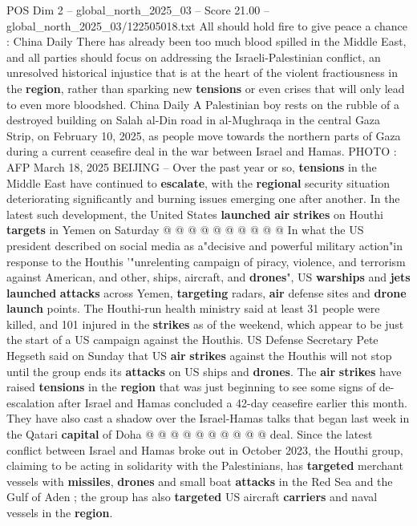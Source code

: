 \begin{textsample}{POS Dim 2 – global\_north\_2025\_03 – Score 21.00 – global\_north\_2025\_03/122505018.txt}  \label{ex:f2_pos_414}
All should hold fire to give peace a chance : China Daily There has already been too much blood spilled in the Middle East, and all parties should focus on addressing the Israeli-Palestinian conflict, an unresolved historical injustice that is at the heart of the violent fractiousness in the \textbf{region}, rather than sparking new \textbf{tensions} or even crises that will only lead to even more bloodshed.
China Daily A Palestinian boy rests on the rubble of a destroyed building on Salah al-Din road in al-Mughraqa in the central Gaza Strip, on February 10, 2025, as people move towards the northern parts of Gaza during a current ceasefire deal in the war between Israel and Hamas.
PHOTO : AFP March 18, 2025 BEIJING -- Over the past year or so, \textbf{tensions} in the Middle East have continued to \textbf{escalate}, with the \textbf{regional} security situation deteriorating significantly and burning issues emerging one after another.
In the latest such development, the United States \textbf{launched} \textbf{air} \textbf{strikes} on Houthi \textbf{targets} in Yemen on Saturday @ @ @ @ @ @ @ @ @ @ In what the US president described on social media as a"decisive and powerful military action"in response to the Houthis '"unrelenting campaign of piracy, violence, and terrorism against American, and other, ships, aircraft, and \textbf{drones}", US \textbf{warships} and \textbf{jets} \textbf{launched} \textbf{attacks} across Yemen, \textbf{targeting} radars, \textbf{air} defense sites and \textbf{drone} \textbf{launch} points.
The Houthi-run health ministry said at least 31 people were killed, and 101 injured in the \textbf{strikes} as of the weekend, which appear to be just the start of a US campaign against the Houthis.
US Defense Secretary Pete Hegseth said on Sunday that US \textbf{air} \textbf{strikes} against the Houthis will not stop until the group ends its \textbf{attacks} on US ships and \textbf{drones}.
The \textbf{air} \textbf{strikes} have raised \textbf{tensions} in the \textbf{region} that was just beginning to see some signs of de-escalation after Israel and Hamas concluded a 42-day ceasefire earlier this month.
They have also cast a shadow over the Israel-Hamas talks that began last week in the Qatari \textbf{capital} of Doha @ @ @ @ @ @ @ @ @ @ deal.
Since the latest conflict between Israel and Hamas broke out in October 2023, the Houthi group, claiming to be acting in solidarity with the Palestinians, has \textbf{targeted} merchant vessels with \textbf{missiles}, \textbf{drones} and small boat \textbf{attacks} in the Red Sea and the Gulf of Aden ; the group has also \textbf{targeted} US aircraft \textbf{carriers} and naval vessels in the \textbf{region}.

\end{textsample}

